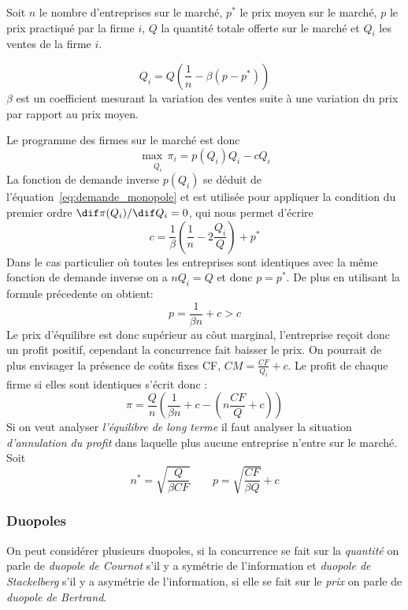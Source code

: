 \begin{tcolorbox}[title=Concurrence monopolistique]
  Soit $n$ le nombre d'entreprises sur le marché, $p^*$ le prix moyen sur le marché,
  $p$ le prix practiqué par la firme $i$, $Q$ la quantité totale offerte sur le marché 
  et $Q_i$ les ventes de la firme $i$.
  
  \begin{equation}
  	Q_i= Q\left(\frac{1}{n}-\beta (p-p^*)\right)
    \label{eq:demande_monopole}
  \end{equation}
  $\beta$ est un coefficient mesurant la variation des ventes 
  suite à une variation du prix par rapport au prix moyen.
  
  Le programme des firmes sur le marché est donc
  \[
  	\underset{Q_i}{\max \, \pi_i}= p(Q_i)Q_i - c Q_i
  \]
  La fonction de demande inverse $p(Q_i)$ se déduit de l'équation~\ref{eq:demande_monopole}
  et est utilisée pour appliquer la condition du premier ordre $\dif \pi(Q_i)/ \dif Q_i = 0$,
  qui nous permet d'écrire
  \[
  	c= \frac{1}{\beta}\left(\frac{1}{n}-2\frac{Q_i}{Q}\right)+p^*
  \]
  Dans le cas particulier où toutes les entreprises sont identiques 
  avec la même fonction de demande inverse on a $nQ_i=Q$ et donc $p=p^*$. 
  De plus en utilisant la formule précedente on obtient:
  \[
  	p=\frac{1}{\beta n}+c >c 
  \]
  Le prix d'équilibre est donc supérieur au côut marginal, 
  l'entreprise reçoit donc un profit positif, cependant la concurrence fait baisser le prix. 
  On pourrait de plus envisager la présence de coûts fixes CF, $CM=\frac{CF}{Q_i}+c$. 
  Le profit de chaque firme si elles sont identiques s'écrit donc :
  \[
  	\pi = \frac{Q}{n} \left( \frac{1}{\beta n}+c- \left( n\frac{CF}{Q}+c \right) \right)
  \]
  Si on veut analyser \emph{l'équilibre de long terme} 
  il faut analyser la situation \emph{d'annulation du profit} 
  dans laquelle plus aucune entreprise n'entre sur le marché.
  Soit
  \[
  	n^* = \sqrt{\frac{Q}{\beta CF}} \qquad p=\sqrt{\frac{CF}{\beta Q}}+c
  \]
\end{tcolorbox}

\subsubsection{Duopoles} %
\label{sub:duopoles}

On peut considérer plusieurs duopoles, si la concurrence se fait sur la \emph{quantité} 
on parle de \emph{duopole de Cournot} s'il y a symétrie de l'information
et \emph{duopole de Stackelberg} s'il y a asymétrie de l'information, 
si elle se fait sur le \emph{prix} on parle de \emph{duopole de Bertrand}.


